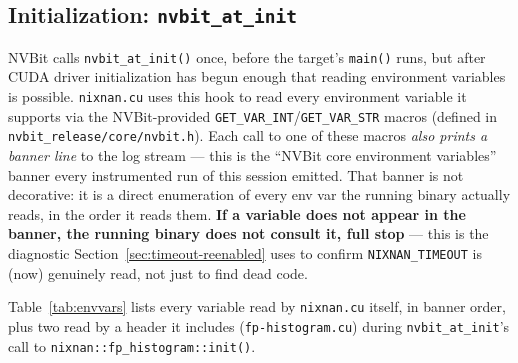 \documentclass[11pt]{article}
\begin{document}
\subsection{Initialization: \texttt{nvbit\_at\_init}}
\label{sec:init}

NVBit calls \texttt{nvbit\_at\_init()} once, before the target's
\texttt{main()} runs, but after CUDA driver initialization has begun
enough that reading environment variables is possible. \texttt{nixnan.cu}
uses this hook to read every environment variable it supports via the
NVBit-provided \texttt{GET\_VAR\_INT}/\texttt{GET\_VAR\_STR} macros
(defined in \texttt{nvbit\_release/core/nvbit.h}). Each call to one of
these macros \emph{also prints a banner line} to the log stream --- this
is the ``NVBit core environment variables'' banner every instrumented run
of this session emitted. That banner is not decorative: it is a direct
enumeration of every env var the running binary actually reads, in the
order it reads them. \textbf{If a variable does not appear in the banner,
the running binary does not consult it, full stop} --- this is the
diagnostic Section~\ref{sec:timeout-reenabled} uses to confirm
\texttt{NIXNAN\_TIMEOUT} is (now) genuinely read, not just to find dead
code.

Table~\ref{tab:envvars} lists every variable read by \texttt{nixnan.cu}
itself, in banner order, plus two read by a header it includes
(\texttt{fp-histogram.cu}) during \texttt{nvbit\_at\_init}'s call to
\texttt{nixnan::fp\_histogram::init()}.
\end{document}
